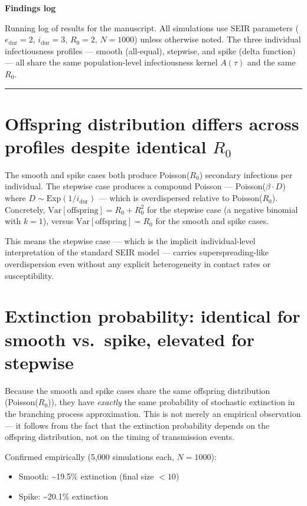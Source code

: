 \documentclass[11pt]{article}
\begin{document}
\noindent\textbf{\large Findings log}

\medskip

\noindent Running log of results for the manuscript. All simulations use SEIR parameters ($e_{\text{dur}} = 2$, $i_{\text{dur}} = 3$, $R_0 = 2$, $N = 1000$) unless otherwise noted. The three individual infectiousness profiles --- smooth (all-equal), stepwise, and spike (delta function) --- all share the same population-level infectiousness kernel $A(\tau)$ and the same $R_0$.

\bigskip\noindent\rule{\textwidth}{0.4pt}\bigskip

\section{Offspring distribution differs across profiles despite identical \texorpdfstring{$R_0$}{R0}}

The smooth and spike cases both produce Poisson($R_0$) secondary infections per individual. The stepwise case produces a compound Poisson --- Poisson($\beta \cdot D$) where $D \sim \text{Exp}(1/i_{\text{dur}})$ --- which is overdispersed relative to Poisson($R_0$). Concretely, $\text{Var}[\text{offspring}] = R_0 + R_0^2$ for the stepwise case (a negative binomial with $k = 1$), versus $\text{Var}[\text{offspring}] = R_0$ for the smooth and spike cases.

This means the stepwise case --- which is the implicit individual-level interpretation of the standard SEIR model --- carries superspreading-like overdispersion even without any explicit heterogeneity in contact rates or susceptibility.

\section{Extinction probability: identical for smooth vs.\ spike, elevated for stepwise}

Because the smooth and spike cases share the same offspring distribution (Poisson($R_0$)), they have \textit{exactly} the same probability of stochastic extinction in the branching process approximation. This is not merely an empirical observation --- it follows from the fact that the extinction probability depends on the offspring distribution, not on the timing of transmission events.

Confirmed empirically (5,000 simulations each, $N = 1000$):
\begin{itemize}
\item Smooth: \textasciitilde19.5\% extinction (final size $< 10$)
\item Spike: \textasciitilde20.1\% extinction
\end{itemize}
\end{document}
